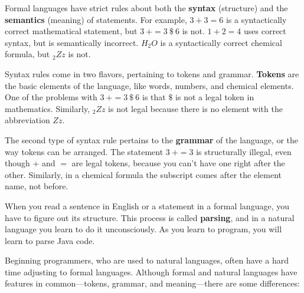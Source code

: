 
Formal languages have strict rules about both the {\bf syntax} (structure) and the {\bf semantics} (meaning) of statements.
For example, $3 + 3 = 6$ is a syntactically correct mathematical statement, but $3\ + = 3\ \$\ 6$ is not.
$1 + 2 = 4$ uses correct syntax, but is semantically incorrect.
$H_2O$ is a syntactically correct chemical formula, but $_2Zz$ is not.



Syntax rules come in two flavors, pertaining to tokens and grammar.
{\bf Tokens} are the basic elements of the language, like words, numbers, and chemical elements.
One of the problems with $3\ + = 3\ \$\ 6$ is that $\$$ is not a legal token in mathematics.
Similarly, $_2Zz$ is not legal because there is no element with the abbreviation $Zz$.


The second type of syntax rule pertains to the {\bf grammar} of the language, or the way tokens can be arranged.
The statement $3\ + = 3$ is structurally illegal, even though $+$ and $=$ are legal tokens, because you can't have one right after the other.
Similarly, in a chemical formula the subscript comes after the element name, not before.


When you read a sentence in English or a statement in a formal language, you have to figure out its structure.
This process is called {\bf parsing}, and in a natural language you learn to do it unconsciously.
As you learn to program, you will learn to parse Java code.



Beginning programmers, who are used to natural languages, often have a hard time adjusting to formal languages.
Although formal and natural languages have features in common---tokens, grammar, and meaning---there are some differences:

